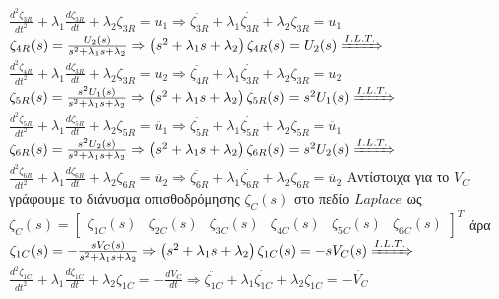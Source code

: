 \documentclass[12pt]{article}
\begin{document}
\newline
$ \frac{d^2\zeta_{3R}}{dt^2} +\lambda_{1}\frac{d\zeta_{3R}}{dt}+\lambda_{2}\zeta_{3R}=u_{1} \Rightarrow \ddot{\zeta_{3R}} +\lambda_{1}\dot{\zeta_{3R}}+\lambda_{2}\zeta_{3R}=u_{1}$
\newline
\newline
$\zeta_{4R}(s)=\frac{U_{2}(s)}{s^2+\lambda_{1}s+\lambda_{2}} \Rightarrow \left( s^2+\lambda_{1}s+\lambda_{2} \right)\zeta_{4R}(s) = U_{2}(s)\xRightarrow{I.L.T.}$
\newline
$ \frac{d^2\zeta_{4R}}{dt^2} +\lambda_{1}\frac{d\zeta_{3R}}{dt}+\lambda_{2}\zeta_{3R}=u_{2} \Rightarrow \ddot{\zeta_{4R}} +\lambda_{1}\dot{\zeta_{3R}}+\lambda_{2}\zeta_{3R}=u_{2}$
\newline
\newline
$\zeta_{5R}(s)=\frac{s^{2}U_{1}(s)}{s^2+\lambda_{1}s+\lambda_{2}} \Rightarrow \left( s^2+\lambda_{1}s+\lambda_{2} \right)\zeta_{5R}(s) = s^{2}U_{1}(s)
\xRightarrow{I.L.T.}$
\newline
$ \frac{d^2\zeta_{5R}}{dt^2} +\lambda_{1}\frac{d\zeta_{5R}}{dt}+\lambda_{2}\zeta_{5R}=\ddot{u_{1}} \Rightarrow \ddot{\zeta_{5R}} +\lambda_{1}\dot{\zeta_{5R}}+\lambda_{2}\zeta_{5R}=\ddot{u_{1}}$
\newline
\newline
$\zeta_{6R}(s)=\frac{s^{2}U_{2}(s)}{s^2+\lambda_{1}s+\lambda_{2}} \Rightarrow \left( s^2+\lambda_{1}s+\lambda_{2} \right)\zeta_{6R}(s) = s^{2}U_{2}(s)
\xRightarrow{I.L.T.}$
\newline
$ \frac{d^2\zeta_{6R}}{dt^2} +\lambda_{1}\frac{d\zeta_{6R}}{dt}+\lambda_{2}\zeta_{6R}=\ddot{u_{2}} \Rightarrow \ddot{\zeta_{6R}} +\lambda_{1}\dot{\zeta_{6R}}+\lambda_{2}\zeta_{6R}=\ddot{u_{2}}$
\newline
\newline
Αντίστοιχα για το $V_{C}$ γράφουμε το διάνυσμα οπισθοδρόμησης $\zeta_{C}(s)$ στο πεδίο $Laplace$ ως
\\
$\zeta_{C}(s)=
\begin{bmatrix}
		\zeta_{1C}(s) & \zeta_{2C}(s) & \zeta_{3C}(s)  &  \zeta_{4C}(s) &  \zeta_{5C}(s) &  \zeta_{6C}(s)
\end{bmatrix}^{T}$ \quad άρα
\newline
\newline
$\zeta_{1C}(s)=-\frac{sV_{C}(s)}{s^2+\lambda_{1}s+\lambda_{2}} \Rightarrow \left( s^2+\lambda_{1}s+\lambda_{2} \right)\zeta_{1C}(s) = -sV_{C}(s)\xRightarrow{I.L.T.}$
\newline
$ \frac{d^2\zeta_{1C}}{dt^2} +\lambda_{1}\frac{d\zeta_{1C}}{dt}+\lambda_{2}\zeta_{1C}=-\frac{dV_{C}}{dt} \Rightarrow \ddot{\zeta_{1C}}+ \lambda_{1}\dot{\zeta_{1C}}+\lambda_{2}\zeta_{1C}=-\dot{V_{C}}$
\end{document}
